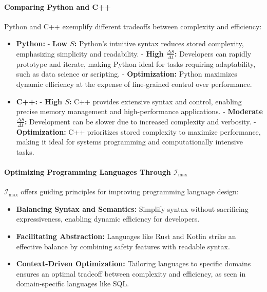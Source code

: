 \documentclass[12pt]{article}
\begin{document}
\paragraph{Comparing Python and C++}
Python and C++ exemplify different tradeoffs between complexity and efficiency:
\begin{itemize}
    \item \textbf{Python:}
        - \textbf{Low \(S\):} Python’s intuitive syntax reduces stored complexity, emphasizing simplicity and readability.
        - \textbf{High \(\frac{\Delta S}{\Delta t}\):} Developers can rapidly prototype and iterate, making Python ideal for tasks requiring adaptability, such as data science or scripting.
        - \textbf{Optimization:} Python maximizes dynamic efficiency at the expense of fine-grained control over performance.
    \item \textbf{C++:}
        - \textbf{High \(S\):} C++ provides extensive syntax and control, enabling precise memory management and high-performance applications.
        - \textbf{Moderate \(\frac{\Delta S}{\Delta t}\):} Development can be slower due to increased complexity and verbosity.
        - \textbf{Optimization:} C++ prioritizes stored complexity to maximize performance, making it ideal for systems programming and computationally intensive tasks.
\end{itemize}

\paragraph{Optimizing Programming Languages Through \(\mathcal{I}_{\text{max}}\)}
\(\mathcal{I}_{\text{max}}\) offers guiding principles for improving programming language design:
\begin{itemize}
    \item \textbf{Balancing Syntax and Semantics:} Simplify syntax without sacrificing expressiveness, enabling dynamic efficiency for developers.
    \item \textbf{Facilitating Abstraction:} Languages like Rust and Kotlin strike an effective balance by combining safety features with readable syntax.
    \item \textbf{Context-Driven Optimization:} Tailoring languages to specific domains ensures an optimal tradeoff between complexity and efficiency, as seen in domain-specific languages like SQL.
\end{itemize}
\end{document}
